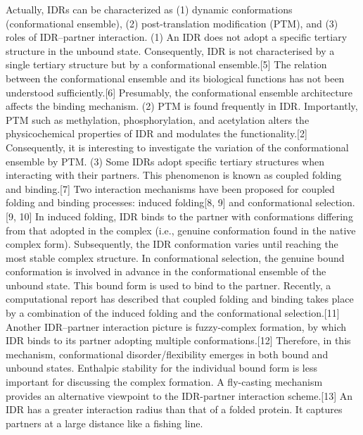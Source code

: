 Actually, IDRs can be characterized as (1) dynamic conformations (conformational ensemble), (2) post-translation modification (PTM), and (3) roles of IDR–partner interaction. 
(1) An IDR does not adopt a specific tertiary structure in the unbound state. Consequently, IDR is not characterised by a single tertiary structure but by a conformational ensemble.[5] 
The relation between the conformational ensemble and its biological functions has not been understood sufficiently.[6] 
Presumably, the conformational ensemble architecture affects the binding mechanism. 
(2) PTM is found frequently in IDR. 
Importantly, PTM such as methylation, phosphorylation, and acetylation alters the physicochemical properties of IDR and modulates the functionality.[2]
Consequently, it is interesting to investigate the variation of the conformational ensemble by PTM. 
(3) Some IDRs adopt specific tertiary structures when interacting with their partners. 
This phenomenon is known as coupled folding and binding.[7] 
Two interaction mechanisms have been proposed for coupled folding and binding processes: induced folding[8, 9] and conformational selection.[9, 10] 
In induced folding, IDR binds to the partner with conformations differing from that adopted in the complex (i.e., genuine conformation found in the native complex form). 
Subsequently, the IDR conformation varies until reaching the most stable complex structure. 
In conformational selection, the genuine bound conformation is involved in advance in the conformational ensemble of the unbound state. 
This bound form is used to bind to the partner. 
Recently, a computational report has described that coupled folding and binding takes place by a combination of the induced folding and the conformational selection.[11] 
Another IDR–partner interaction picture is fuzzy-complex formation, by which IDR binds to its partner adopting multiple conformations.[12] 
Therefore, in this mechanism, conformational disorder/flexibility emerges in both bound and unbound states. 
Enthalpic stability for the individual bound form is less important for discussing the complex formation. 
A fly-casting mechanism provides an alternative viewpoint to the IDR-partner interaction scheme.[13] 
An IDR has a greater interaction radius than that of a folded protein. 
It captures partners at a large distance like a fishing line.
